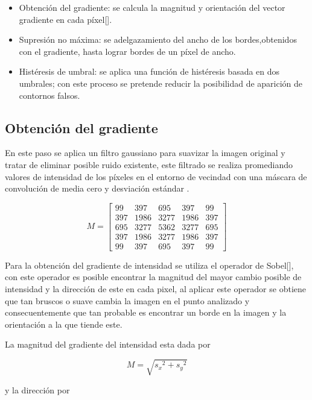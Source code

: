 \begin{itemize}
\item Obtención del gradiente: se calcula la magnitud y orientación del vector gradiente en cada píxel[]. 
\item Supresión no máxima: se adelgazamiento del ancho de los bordes,obtenidos con el gradiente, hasta lograr bordes de un píxel de ancho. 
\item Histéresis de umbral: se aplica una función de histéresis basada en dos umbrales; con este proceso se pretende reducir la posibilidad de aparición de contornos falsos. 
\end{itemize}

\subsection{Obtención del gradiente}

En este paso se aplica un filtro gaussiano para suavizar la imagen original y tratar de eliminar posible ruido existente, este filtrado se realiza promediando valores de intensidad de los píxeles en el entorno de vecindad con una 
máscara de convolución de media cero y desviación estándar \sigma.

\begin{equation}
M =\begin{bmatrix}
99 & 397 & 695 & 397 & 99 \\ 
397 & 1986 & 3277 & 1986 & 397 \\ 
695 & 3277 & 5362 & 3277 & 695 \\ 
397 & 1986 & 3277 & 1986 & 397 \\ 
99 & 397 & 695 & 397 & 99
\end{bmatrix}
\end{equation}

Para la obtención del gradiente de intensidad se utiliza el operador de Sobel[], con este operador es posible encontrar la magnitud del mayor cambio posible de intensidad y la dirección de este en cada pixel, al aplicar este operador se obtiene que tan bruscos o suave cambia la imagen en el punto analizado y consecuentemente que tan probable es encontrar un borde en la imagen y la orientación a la que tiende este.

La magnitud del gradiente del intensidad esta dada por 

\begin{equation}
M=\sqrt{{s_{x}}^{2}+{s_{y}}^{2}}
\end{equation}

y la dirección por

